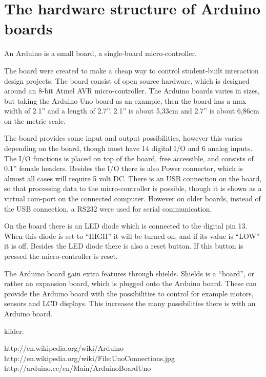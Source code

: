 
\section{The hardware structure of Arduino boards}
An Arduino is a small board, a single-board micro-controller.

The board were created to make a cheap way to control student-built interaction design projects. The board consist of open source hardware, which is designed around an 8-bit Atmel AVR micro-controller. The Arduino boards varies in sizes, but taking the Arduino Uno board as an example, then the board has a max width of 2.1'' and a length of 2.7''. 2.1'' is about 5,33cm and 2.7'' is about 6,86cm on the metric scale. 

The board provides some input and output possibilities, however this varies depending on the board, though most have 14 digital I/O and 6 analog inputs. The I/O functions is placed on top of the board, free accessible, and consists of 0.1'' female headers. Besides the I/O there is also Power connector, which is almost all cases will require 5 volt DC. There is an USB connection on the board, so that processing data to the micro-controller is possible, though it is shown as a virtual com-port on the connected computer. However on older boards, instead of the USB connection, a RS232 were used for serial communication. 

On the board there is an LED diode which is connected to the digital pin 13. When this diode is set to ``HIGH'' it will be turned on, and if its value is ``LOW'' it is off. Besides the LED diode there is also a reset button. If this button is pressed the micro-controller is reset. 

The Arduino board gain extra features through shields. Shields is a ``board'', or rather an expansion board, which is plugged onto the Arduino board. These can provide the Arduino board with the possibilities to control for example motors, sensors and LCD displays. This increases the many possibilities there is with an Arduino board. 

kilder:

http://en.wikipedia.org/wiki/Arduino
http://en.wikipedia.org/wiki/File:UnoConnections.jpg
http://arduino.cc/en/Main/ArduinoBoardUno
